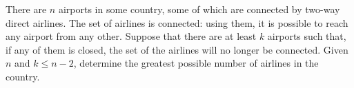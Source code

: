 \problem{}
There are $n$ airports in some country, some of which are connected by two-way direct
airlines.
The set of airlines is connected: using them, it is possible to reach any airport from
any other.
Suppose that there are at least $k$ airports such that, if any of them is closed, the
set of the airlines will no longer be connected.
Given $n$ and $k \leq n - 2$, determine the greatest possible number of airlines in the
country.
\solution
\endproblem
